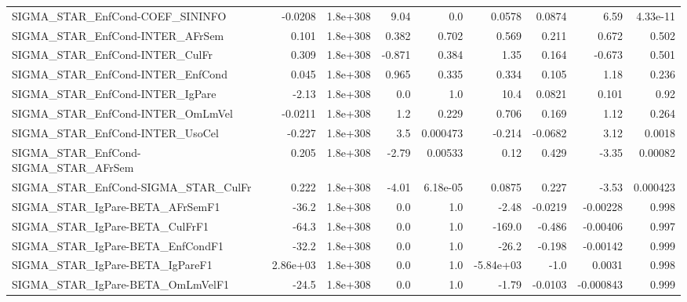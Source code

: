 \begin{tabular}{lrrrrrrrr}
SIGMA\_STAR\_EnfCond-COEF\_SININFO       &     -0.0208 &     1.8e+308 &    9.04 &      0.0 &     0.0578 &      0.0874 &         6.59 &      4.33e-11 \\
SIGMA\_STAR\_EnfCond-INTER\_AFrSem       &       0.101 &     1.8e+308 &   0.382 &    0.702 &      0.569 &       0.211 &        0.672 &         0.502 \\
SIGMA\_STAR\_EnfCond-INTER\_CulFr        &       0.309 &     1.8e+308 &  -0.871 &    0.384 &       1.35 &       0.164 &       -0.673 &         0.501 \\
SIGMA\_STAR\_EnfCond-INTER\_EnfCond      &       0.045 &     1.8e+308 &   0.965 &    0.335 &      0.334 &       0.105 &         1.18 &         0.236 \\
SIGMA\_STAR\_EnfCond-INTER\_IgPare       &       -2.13 &     1.8e+308 &     0.0 &      1.0 &       10.4 &      0.0821 &        0.101 &          0.92 \\
SIGMA\_STAR\_EnfCond-INTER\_OmLmVel      &     -0.0211 &     1.8e+308 &     1.2 &    0.229 &      0.706 &       0.169 &         1.12 &         0.264 \\
SIGMA\_STAR\_EnfCond-INTER\_UsoCel       &      -0.227 &     1.8e+308 &     3.5 & 0.000473 &     -0.214 &     -0.0682 &         3.12 &        0.0018 \\
SIGMA\_STAR\_EnfCond-SIGMA\_STAR\_AFrSem  &       0.205 &     1.8e+308 &   -2.79 &  0.00533 &       0.12 &       0.429 &        -3.35 &       0.00082 \\
SIGMA\_STAR\_EnfCond-SIGMA\_STAR\_CulFr   &       0.222 &     1.8e+308 &   -4.01 & 6.18e-05 &     0.0875 &       0.227 &        -3.53 &      0.000423 \\
SIGMA\_STAR\_IgPare-BETA\_AFrSemF1       &       -36.2 &     1.8e+308 &     0.0 &      1.0 &      -2.48 &     -0.0219 &     -0.00228 &         0.998 \\
SIGMA\_STAR\_IgPare-BETA\_CulFrF1        &       -64.3 &     1.8e+308 &     0.0 &      1.0 &     -169.0 &      -0.486 &     -0.00406 &         0.997 \\
SIGMA\_STAR\_IgPare-BETA\_EnfCondF1      &       -32.2 &     1.8e+308 &     0.0 &      1.0 &      -26.2 &      -0.198 &     -0.00142 &         0.999 \\
SIGMA\_STAR\_IgPare-BETA\_IgPareF1       &    2.86e+03 &     1.8e+308 &     0.0 &      1.0 &  -5.84e+03 &        -1.0 &       0.0031 &         0.998 \\
SIGMA\_STAR\_IgPare-BETA\_OmLmVelF1      &       -24.5 &     1.8e+308 &     0.0 &      1.0 &      -1.79 &     -0.0103 &    -0.000843 &         0.999 \\

\end{tabular}
